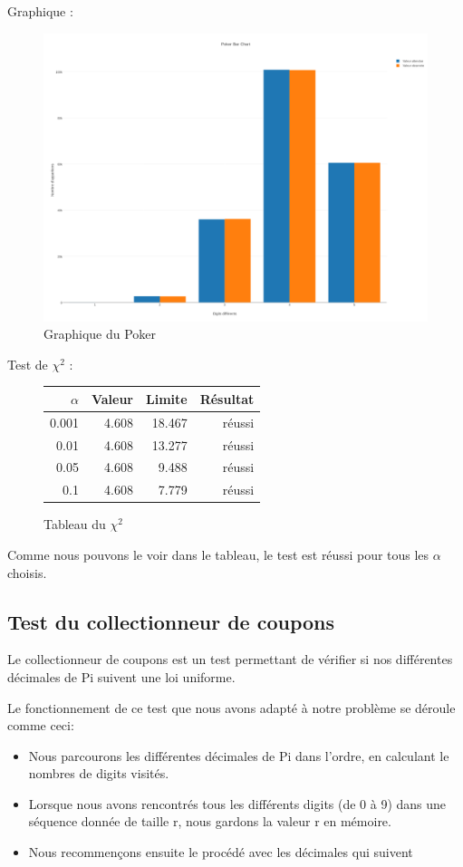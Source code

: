 \documentclass[10pt,a4paper]{article}
\begin{document}
	\newpage
	Graphique :
	\begin{figure}[h]
		\centering
		\includegraphics[scale=0.25]{../chart_images/poker_bar_chart.png}
		\caption{Graphique du Poker}
	\end{figure}
	
	Test de $\chi^2$ :
	\begin{figure}[h]
		\centering
		\begin{tabular}{|r|r|r|r|}
			\hline
			$\alpha$ & Valeur & Limite & Résultat\\
			\hline
			0.001 & 4.608 & 18.467 & réussi\\
			0.01 & 4.608 & 13.277 & réussi\\
			0.05 & 4.608 & 9.488 & réussi\\
			0.1 & 4.608 & 7.779 & réussi\\
			\hline
		\end{tabular}
		\caption{Tableau du $\chi^2$}
	\end{figure}
	
	Comme nous pouvons le voir dans le tableau, le test est réussi pour tous les $\alpha$ choisis.
		
\newpage
	
\subsection{Test du collectionneur de coupons}
Le collectionneur de coupons est un test permettant de vérifier si nos différentes décimales de Pi suivent une loi uniforme.
 
Le fonctionnement de ce test que nous avons adapté à notre problème se déroule comme ceci:  
\begin{itemize}
\item Nous parcourons les différentes décimales de Pi dans l'ordre, en calculant le nombres de digits visités.
\item Lorsque nous avons rencontrés tous les différents digits (de 0 à 9) dans une séquence donnée de taille r, nous gardons la valeur r en mémoire.
\item Nous recommençons ensuite le procédé avec les décimales qui suivent 
\end{itemize}
\end{document}
